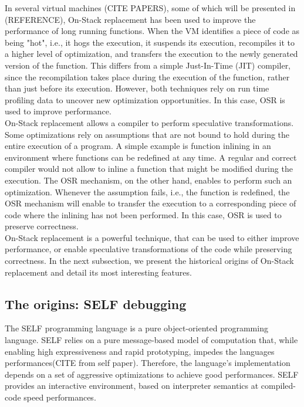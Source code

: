 In several virtual machines (CITE PAPERS), some of which will be presented in (REFERENCE), On-Stack replacement has been used to improve the performance of long running functions.
When the VM identifies a piece of code as being "hot", i.e., it hogs the execution, it suspends its execution, recompiles it to a higher level of optimization, and transfers the execution to the newly generated version of the function.
This differs from a simple Just-In-Time (JIT) compiler, since the recompilation takes place during the execution of the function, rather than just before its execution.
However, both techniques rely on run time profiling data to uncover new optimization opportunities.
In this case, OSR is used to improve performance.\\

On-Stack replacement allows a compiler to perform speculative transformations.
Some optimizations rely on assumptions that are not bound to hold during the entire execution of a program.
A simple example is function inlining in an environment where functions can be redefined at any time.
A regular and correct compiler would not allow to inline a function that might be modified during the execution.
The OSR mechanism, on the other hand, enables to perform such an optimization.
Whenever the assumption fails, i.e., the function is redefined, the OSR mechanism will enable to transfer the execution to a corresponding piece of code where the inlining has not been performed.
In this case, OSR is used to preserve correctness.\\

On-Stack replacement is a powerful technique, that can be used to either improve performance, or enable speculative transformations of the code while preserving correctness.
In the next subsection, we present the historical origins of On-Stack replacement and detail its most interesting features.\\ %
  

\subsection{The origins: SELF debugging}
The SELF programming language is a pure object-oriented programming language.
SELF relies on a pure message-based model of computation that, while enabling high expressiveness and rapid prototyping, impedes the languages performances(CITE from self paper).
Therefore, the language's implementation depends on a set of aggressive optimizations to achieve good performances\cite{holzle1992debugging}.
SELF provides an interactive environment, based on interpreter semantics at compiled-code speed performances.\\

